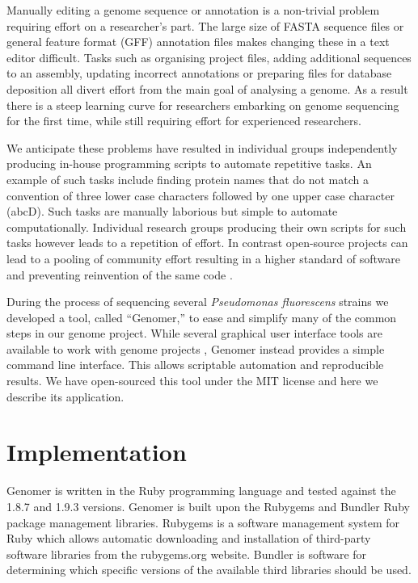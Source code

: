 \documentclass[10pt]{article}
\begin{document}
Manually editing a genome sequence or annotation is a non-trivial problem
requiring effort on a researcher's part. The large size of FASTA sequence files
or general feature format (GFF) annotation files makes changing these in a text
editor difficult. Tasks such as organising project files, adding additional
sequences to an assembly, updating incorrect annotations or preparing files for
database deposition all divert effort from the main goal of analysing a genome.
As a result there is a steep learning curve for researchers embarking on genome
sequencing for the first time, while still requiring effort for experienced
researchers.

We anticipate these problems have resulted in individual groups independently
producing in-house programming scripts to automate repetitive tasks. An example
of such tasks include finding protein names that do not match a convention of
three lower case characters followed by one upper case character (abcD). Such
tasks are manually laborious but simple to automate computationally. Individual
research groups producing their own scripts for such tasks however leads to a
repetition of effort. In contrast open-source projects can lead to a pooling of
community effort resulting in a higher standard of software and preventing
reinvention of the same code \cite{ince2012}.

During the process of sequencing several \emph{Pseudomonas fluorescens} strains
we developed a tool, called ``Genomer,'' to ease and simplify many of the
common steps in our genome project. While several graphical user interface
tools are available to work with genome projects \cite{tanaka2006,
wilkinson2002, lopez2011, carver2012, gordon1998}, Genomer instead provides a
simple command line interface. This allows scriptable automation and
reproducible results. We have open-sourced this tool under the MIT license and
here we describe its application.

\section*{Implementation}

Genomer is written in the Ruby programming language \cite{ruby-lang,goto2010}
and tested against the 1.8.7 and 1.9.3 versions. Genomer is built upon the
Rubygems and Bundler Ruby package management libraries. Rubygems is a software
management system for Ruby which allows automatic downloading and installation
of third-party software libraries from the rubygems.org website. Bundler is
software for determining which specific versions of the available third
libraries should be used.
\end{document}
